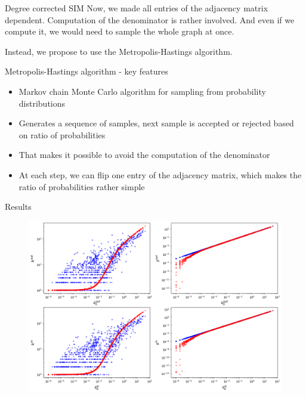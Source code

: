 \documentclass{beamer}
\begin{document}
\begin{frame}{Degree corrected SIM}
Now, we made all entries of the adjacency matrix dependent. Computation of the denominator is rather involved. And even if we compute it, we would need to sample the whole graph at once.

\vspace{30px}
Instead, we propose to use the Metropolis-Hastings algorithm.
\end{frame}

\begin{frame}{Metropolis-Hastings algorithm - key features}
    \begin{itemize}
        \item Markov chain Monte Carlo algorithm for sampling from probability distributions
        \item Generates a sequence of samples, next sample is accepted or rejected based on ratio of probabilities
        \item That makes it possible to avoid the computation of the denominator
        \item At each step, we can flip one entry of the adjacency matrix, which makes the ratio of probabilities rather simple
    \end{itemize}
\end{frame}

\begin{frame}{Results}
\begin{figure}[!ht]
    \centering
    \includegraphics[scale=0.3]{img/Degree_corrected/degrees_strengths_rec.png}
\end{figure}
\end{frame}
\end{document}

